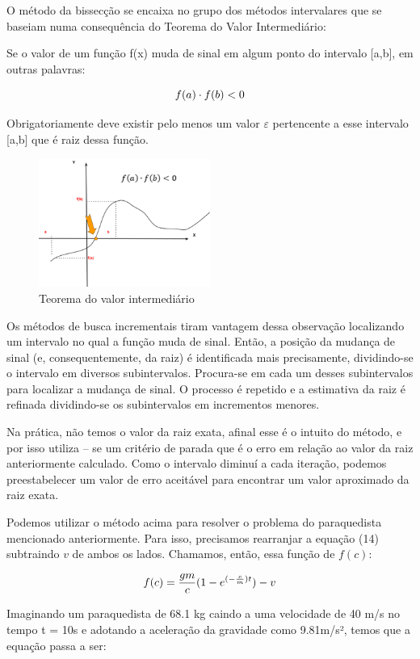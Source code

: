 O método da bissecção se encaixa no grupo dos métodos intervalares que se baseiam numa consequência do Teorema do Valor Intermediário:

Se o valor de um função f(x) muda de sinal em algum ponto do intervalo [a,b], em outras palavras:

$$\Large f(a) \cdot f(b)<0$$

Obrigatoriamente deve existir pelo menos um valor $\varepsilon$ pertencente a esse intervalo [a,b] que é raiz dessa função.

\begin{figure}[H]
	\centering
	\includegraphics[width=0.5\textwidth]{./Imagens/Bissec/bi1.png} 
	\caption{Teorema do valor intermediário}
	\label{fig:OHS1}
\end{figure}

Os métodos de busca incrementais tiram vantagem dessa observação localizando um intervalo no qual a função muda de sinal. Então, a posição da mudança de sinal (e, consequentemente, da raiz) é identificada mais precisamente, dividindo-se o intervalo em diversos subintervalos. Procura-se em cada um desses subintervalos para localizar a mudança de sinal. O processo é repetido e a estimativa da raiz é refinada dividindo-se os subintervalos em incrementos menores.

Na prática, não temos o valor da raiz exata, afinal esse é o intuito do método, e por isso utiliza – se um critério de parada que é o erro em relação ao valor da raiz anteriormente calculado. Como o intervalo diminuí a cada iteração, podemos preestabelecer um valor de erro aceitável para encontrar um valor aproximado da raiz exata.

Podemos utilizar o método acima para resolver o problema do paraquedista mencionado anteriormente.  Para isso, precisamos rearranjar a equação (14) subtraindo $v$ de ambos os lados. Chamamos, então, essa função de $f(c)$:

$$\Large f(c) = \frac{gm}{c}(1-e^{(-\frac{c}{m})t}) - v$$

Imaginando um paraquedista de 68.1 kg caindo a uma velocidade de 40 m/s no tempo t = 10s e adotando a aceleração da gravidade como 9.81m/s², temos que a equação passa a ser:

